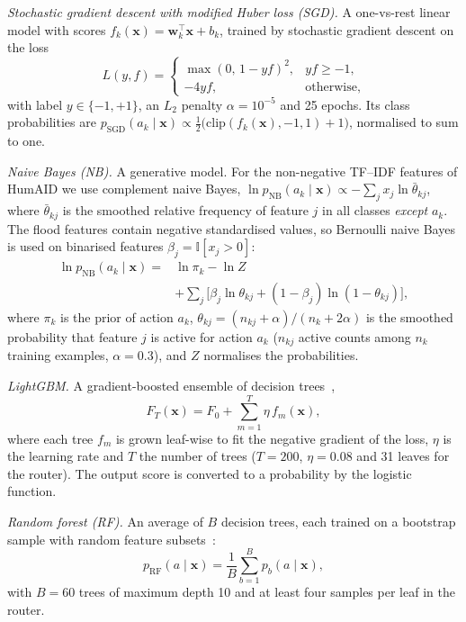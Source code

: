 \documentclass[journal]{IEEEtran}
\begin{document}
\textit{Stochastic gradient descent with modified Huber loss (SGD).} A
one-vs-rest linear model with scores $f_k(\mathbf{x})=\mathbf{w}_k^{\top}\mathbf{x}+b_k$,
trained by stochastic gradient descent on the loss
\begin{equation}
L(y,f)=
\begin{cases}
\max(0,\,1-yf)^2, & yf\geq-1,\\
-4yf, & \text{otherwise},
\end{cases}
\label{eq:huber}
\end{equation}
with label $y\in\{-1,+1\}$, an $L_2$ penalty $\alpha=10^{-5}$ and 25 epochs.
Its class probabilities are
$p_{\mathrm{SGD}}(a_k\mid\mathbf{x})\propto\tfrac12\big(\mathrm{clip}(f_k(\mathbf{x}),-1,1)+1\big)$,
normalised to sum to one.

\textit{Naive Bayes (NB).} A generative model. For the non-negative TF--IDF
features of HumAID we use complement naive Bayes,
$\ln p_{\mathrm{NB}}(a_k\mid\mathbf{x})\propto-\sum_j x_j\ln\bar\theta_{kj}$,
where $\bar\theta_{kj}$ is the smoothed relative frequency of feature $j$ in all
classes \emph{except} $a_k$. The flood features contain negative standardised
values, so Bernoulli naive Bayes is used on binarised features
$\beta_j=\mathbb{I}[x_j>0]$:
\begin{equation}
\begin{aligned}
\ln p_{\mathrm{NB}}(a_k\mid\mathbf{x})={}&\ln\pi_k-\ln Z\\
&+\sum_{j}\Big[\beta_j\ln\theta_{kj}+(1-\beta_j)\ln(1-\theta_{kj})\Big],
\end{aligned}
\label{eq:nb}
\end{equation}
where $\pi_k$ is the prior of action $a_k$,
$\theta_{kj}=(n_{kj}+\alpha)/(n_k+2\alpha)$ is the smoothed probability that
feature $j$ is active for action $a_k$ ($n_{kj}$ active counts among $n_k$
training examples, $\alpha=0.3$), and $Z$ normalises the probabilities.

\textit{LightGBM.} A gradient-boosted ensemble of decision
trees~\cite{ke2017lightgbm},
\begin{equation}
F_T(\mathbf{x})=F_0+\sum_{m=1}^{T}\eta\,f_m(\mathbf{x}),
\label{eq:gbdt}
\end{equation}
where each tree $f_m$ is grown leaf-wise to fit the negative gradient of the
loss, $\eta$ is the learning rate and $T$ the number of trees ($T=200$,
$\eta=0.08$ and 31 leaves for the router). The output score is converted to a
probability by the logistic function.

\textit{Random forest (RF).} An average of $B$ decision trees, each trained on
a bootstrap sample with random feature subsets~\cite{breiman2001randomforest}:
\begin{equation}
p_{\mathrm{RF}}(a\mid\mathbf{x})=\frac{1}{B}\sum_{b=1}^{B}p_b(a\mid\mathbf{x}),
\label{eq:rf}
\end{equation}
with $B=60$ trees of maximum depth 10 and at least four samples per leaf in
the router.
\end{document}
